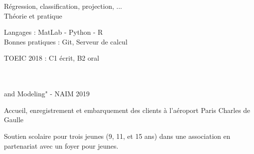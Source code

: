 

Régression, classification, projection, ... \\
Théorie et pratique\\
\vspace{0.2cm}

Langages : MatLab - Python  - R\\
Bonnes pratiques : Git, Serveur de calcul


\vspace{0.1cm}
TOEIC 2018 : C1 écrit, B2 oral

\vspace{0.25cm}

 \\
 \\ \hspace{0.5cm} and Modeling" - NAIM 2019

\vspace{0.25cm}

   Accueil, enregistrement et embarquement des clients à l'aéroport Paris Charles de Gaulle

\divider

Soutien scolaire pour trois jeunes (9, 11, et 15 ans) dans une association en
partenariat avec un foyer pour jeunes.

